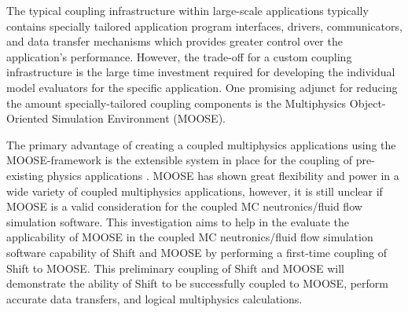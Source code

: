 \documentclass{anstrans}
\begin{document}
The typical coupling infrastructure within large-scale applications typically contains specially tailored application program interfaces, drivers, communicators, and data transfer mechanisms which provides greater control over the application's performance. However, the trade-off for a custom coupling infrastructure is the large time investment required for developing the individual model evaluators for the specific application. One promising adjunct for reducing the amount specially-tailored coupling components is the Multiphysics Object-Oriented Simulation Environment (MOOSE).

The primary advantage of creating a coupled multiphysics applications using the MOOSE-framework is the extensible system in place for the coupling of pre-existing physics applications \cite{moose}. MOOSE has shown great flexibility and power in a wide variety of coupled multiphysics applications, however, it is still unclear if MOOSE is a valid consideration for the coupled MC neutronics/fluid flow simulation software. This investigation aims to help in the evaluate the applicability of MOOSE in the coupled MC neutronics/fluid flow simulation software capability of Shift and MOOSE by performing a first-time coupling of Shift to MOOSE. This preliminary coupling of Shift and MOOSE will demonstrate the ability of Shift to be successfully coupled to MOOSE, perform accurate data transfers, and logical multiphysics calculations.  


\end{document}
